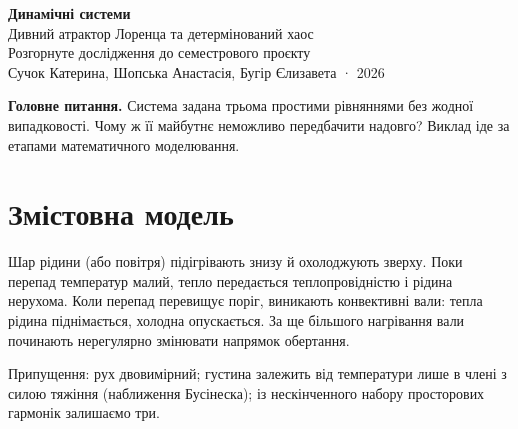 \documentclass[11pt,a4paper]{article}
\begin{document}
\begin{center}
{\color{Blue}\bfseries\LARGE Динамічні системи}\\[6pt]
{\color{Blue}\Large Дивний атрактор Лоренца та детермінований хаос}\\[4pt]
Розгорнуте дослідження до семестрового проєкту\\[2pt]
Сучок Катерина, Шопська Анастасія, Бугір Єлизавета · 2026
\end{center}

\textbf{Головне питання.} Система задана трьома простими рівняннями без жодної випадковості.
Чому ж її майбутнє неможливо передбачити надовго? Виклад іде за етапами математичного моделювання.

\begin{center}
\end{center}

\section{Змістовна модель}
Шар рідини (або повітря) підігрівають знизу й охолоджують зверху. Поки перепад температур малий,
тепло передається теплопровідністю і рідина нерухома. Коли перепад перевищує поріг, виникають
конвективні вали: тепла рідина піднімається, холодна опускається. За ще більшого нагрівання вали
починають нерегулярно змінювати напрямок обертання.

Припущення: рух двовимірний; густина залежить від температури лише в члені з силою тяжіння
(наближення Бусінеска); із нескінченного набору просторових гармонік залишаємо три.
\end{document}
